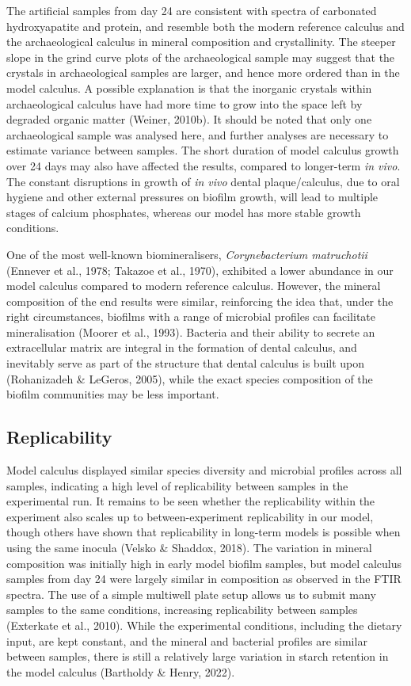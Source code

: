 \documentclass[
]{article}
\begin{document}
The artificial samples from day 24 are consistent with spectra of
carbonated hydroxyapatite and protein, and resemble both the modern
reference calculus and the archaeological calculus in mineral
composition and crystallinity. The steeper slope in the grind curve
plots of the archaeological sample may suggest that the crystals in
archaeological samples are larger, and hence more ordered than in the
model calculus. A possible explanation is that the inorganic crystals
within archaeological calculus have had more time to grow into the space
left by degraded organic matter (Weiner, 2010b). It should be noted that
only one archaeological sample was analysed here, and further analyses
are necessary to estimate variance between samples. The short duration
of model calculus growth over 24 days may also have affected the
results, compared to longer-term \emph{in vivo}. The constant
disruptions in growth of \emph{in vivo} dental plaque/calculus, due to
oral hygiene and other external pressures on biofilm growth, will lead
to multiple stages of calcium phosphates, whereas our model has more
stable growth conditions.

One of the most well-known biomineralisers, \emph{Corynebacterium
matruchotii} (Ennever et al., 1978; Takazoe et al., 1970), exhibited a
lower abundance in our model calculus compared to modern reference
calculus. However, the mineral composition of the end results were
similar, reinforcing the idea that, under the right circumstances,
biofilms with a range of microbial profiles can facilitate
mineralisation (Moorer et al., 1993). Bacteria and their ability to
secrete an extracellular matrix are integral in the formation of dental
calculus, and inevitably serve as part of the structure that dental
calculus is built upon (Rohanizadeh \& LeGeros, 2005), while the exact
species composition of the biofilm communities may be less important.

\hypertarget{replicability}{%
\subsection{Replicability}\label{replicability}}

Model calculus displayed similar species diversity and microbial
profiles across all samples, indicating a high level of replicability
between samples in the experimental run. It remains to be seen whether
the replicability within the experiment also scales up to
between-experiment replicability in our model, though others have shown
that replicability in long-term models is possible when using the same
inocula (Velsko \& Shaddox, 2018). The variation in mineral composition
was initially high in early model biofilm samples, but model calculus
samples from day 24 were largely similar in composition as observed in
the FTIR spectra. The use of a simple multiwell plate setup allows us to
submit many samples to the same conditions, increasing replicability
between samples (Exterkate et al., 2010). While the experimental
conditions, including the dietary input, are kept constant, and the
mineral and bacterial profiles are similar between samples, there is
still a relatively large variation in starch retention in the model
calculus (Bartholdy \& Henry, 2022).
\end{document}
